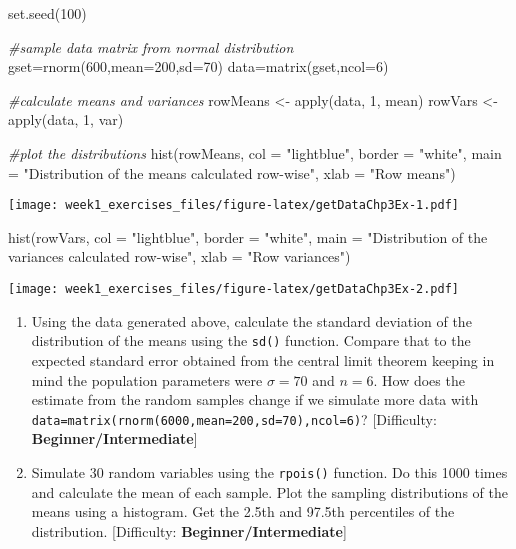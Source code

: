 \documentclass[
]{article}
\newenvironment{Shaded}{\begin{snugshade}}{\end{snugshade}}
\newcommand{\AttributeTok}[1]{\textcolor[rgb]{0.77,0.63,0.00}{#1}}
\newcommand{\CommentTok}[1]{\textcolor[rgb]{0.56,0.35,0.01}{\textit{#1}}}
\newcommand{\DecValTok}[1]{\textcolor[rgb]{0.00,0.00,0.81}{#1}}
\newcommand{\FunctionTok}[1]{\textcolor[rgb]{0.00,0.00,0.00}{#1}}
\newcommand{\NormalTok}[1]{#1}
\newcommand{\OtherTok}[1]{\textcolor[rgb]{0.56,0.35,0.01}{#1}}
\newcommand{\StringTok}[1]{\textcolor[rgb]{0.31,0.60,0.02}{#1}}
\begin{document}
\begin{Shaded}
\begin{Highlighting}[]
\FunctionTok{set.seed}\NormalTok{(}\DecValTok{100}\NormalTok{)}

\CommentTok{\#sample data matrix from normal distribution}
\NormalTok{gset}\OtherTok{=}\FunctionTok{rnorm}\NormalTok{(}\DecValTok{600}\NormalTok{,}\AttributeTok{mean=}\DecValTok{200}\NormalTok{,}\AttributeTok{sd=}\DecValTok{70}\NormalTok{)}
\NormalTok{data}\OtherTok{=}\FunctionTok{matrix}\NormalTok{(gset,}\AttributeTok{ncol=}\DecValTok{6}\NormalTok{)}

\CommentTok{\#calculate means and variances }
\NormalTok{rowMeans }\OtherTok{\textless{}{-}} \FunctionTok{apply}\NormalTok{(data, }\DecValTok{1}\NormalTok{, mean)}
\NormalTok{rowVars }\OtherTok{\textless{}{-}} \FunctionTok{apply}\NormalTok{(data, }\DecValTok{1}\NormalTok{, var)}

\CommentTok{\#plot the distributions}
\FunctionTok{hist}\NormalTok{(rowMeans, }\AttributeTok{col =} \StringTok{"lightblue"}\NormalTok{, }\AttributeTok{border =} \StringTok{"white"}\NormalTok{,}
     \AttributeTok{main =} \StringTok{"Distribution of the means calculated row{-}wise"}\NormalTok{,}
     \AttributeTok{xlab =} \StringTok{"Row means"}\NormalTok{)}
\end{Highlighting}
\end{Shaded}

\texttt{[image: week1\_exercises\_files/figure-latex/getDataChp3Ex-1.pdf]}

\begin{Shaded}
\begin{Highlighting}[]
\FunctionTok{hist}\NormalTok{(rowVars, }\AttributeTok{col =} \StringTok{"lightblue"}\NormalTok{, }\AttributeTok{border =} \StringTok{"white"}\NormalTok{,}
     \AttributeTok{main =} \StringTok{"Distribution of the variances calculated row{-}wise"}\NormalTok{,}
     \AttributeTok{xlab =} \StringTok{"Row variances"}\NormalTok{)}
\end{Highlighting}
\end{Shaded}

\texttt{[image: week1\_exercises\_files/figure-latex/getDataChp3Ex-2.pdf]}

\begin{enumerate}
\def\labelenumi{\arabic{enumi}.}
\setcounter{enumi}{1}
\item
  Using the data generated above, calculate the standard deviation of
  the distribution of the means using the \texttt{sd()} function.
  Compare that to the expected standard error obtained from the central
  limit theorem keeping in mind the population parameters were
  \(\sigma=70\) and \(n=6\). How does the estimate from the random
  samples change if we simulate more data with
  \texttt{data=matrix(rnorm(6000,mean=200,sd=70),ncol=6)}?
  {[}Difficulty: \textbf{Beginner/Intermediate}{]}
\item
  Simulate 30 random variables using the \texttt{rpois()} function. Do
  this 1000 times and calculate the mean of each sample. Plot the
  sampling distributions of the means using a histogram. Get the 2.5th
  and 97.5th percentiles of the distribution. {[}Difficulty:
  \textbf{Beginner/Intermediate}{]}
\end{enumerate}
\end{document}
